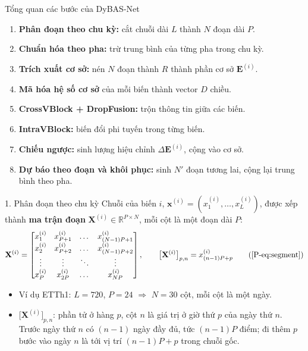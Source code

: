 \documentclass [xcolor=svgnames, notes] {beamer}
\newcommand{\R}{\mathbb{R}}
\begin{document}
\begin{frame}{Tổng quan các bước của DyBAS-Net}
\begin{enumerate}
    \item \textbf{Phân đoạn theo chu kỳ:} cắt chuỗi dài $L$ thành $N$ đoạn dài $P$.
    \item \textbf{Chuẩn hóa theo pha:} trừ trung bình của từng pha trong chu kỳ.
    \item \textbf{Trích xuất cơ sở:} nén $N$ đoạn thành $R$ thành phần cơ sở $\mathbf{E}^{(i)}$.
    \item \textbf{Mã hóa hệ số cơ sở} của mỗi biến thành vector $D$ chiều.
    \item \textbf{CrossVBlock + DropFusion:} trộn thông tin giữa các biến.
    \item \textbf{IntraVBlock:} biến đổi phi tuyến trong từng biến.
    \item \textbf{Chiếu ngược:} sinh lượng hiệu chỉnh $\Delta\mathbf{E}^{(i)}$, cộng vào cơ sở.
    \item \textbf{Dự báo theo đoạn và khôi phục:} sinh $N'$ đoạn tương lai, cộng lại trung bình theo pha.
\end{enumerate}

\end{frame}

\begin{frame}{1. Phân đoạn theo chu kỳ}
\small
Chuỗi của biến $i$, $\mathbf{x}^{(i)} = (x^{(i)}_1,\dots,x^{(i)}_L)$, được xếp thành \textbf{ma trận đoạn}
$\mathbf{X}^{(i)}\in\R^{P\times N}$, mỗi cột là một đoạn dài $P$:
\[
\mathbf{X}^{(i)} =
\begin{bmatrix}
x^{(i)}_1 & x^{(i)}_{P+1} & \dots & x^{(i)}_{(N-1)P+1}\\
x^{(i)}_2 & x^{(i)}_{P+2} & \dots & x^{(i)}_{(N-1)P+2}\\
\vdots & \vdots & \ddots & \vdots\\
x^{(i)}_P & x^{(i)}_{2P} & \dots & x^{(i)}_{NP}
\end{bmatrix},
\qquad \big[\mathbf{X}^{(i)}\big]_{p,n} = x^{(i)}_{(n-1)P+p} \tag{\ref*{P-eq:segment}}\]
\begin{itemize}
    \item Ví dụ ETTh1: $L=720$, $P=24$ $\Rightarrow$ $N=30$ cột, mỗi cột là một ngày.
    \item $\big[\mathbf{X}^{(i)}\big]_{p,n}$: phần tử ở hàng $p$, cột $n$ là giá trị ở giờ thứ $p$ của ngày thứ $n$.
          Trước ngày thứ $n$ có $(n-1)$ ngày đầy đủ, tức $(n-1)P$ điểm; đi thêm $p$ bước vào ngày $n$ là tới vị trí
          $(n-1)P+p$ trong chuỗi gốc.
\end{itemize}
\end{frame}
\end{document}
